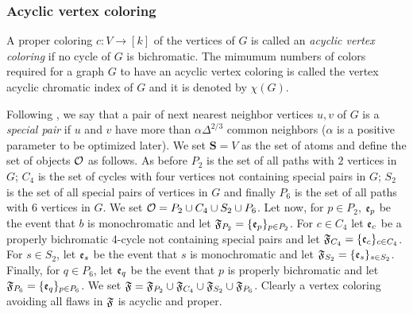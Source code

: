 \documentclass[11pt]{article}
\let\a=\alpha \let\b=\beta \let\ch=\chi \let\d=\delta \let\e=\varepsilon
\let\D=\Delta \let\F=\Phi \let\G=\Gamma \let\L=\Lambda \let\Th=\Theta
\let\\=\noindent
\begin{document}
\subsubsection{Acyclic vertex coloring}
A proper coloring $c: V\to [k]$ of the vertices of $G$ is called
an {\it acyclic vertex  coloring} if no cycle of $G$
is bichromatic. The mimumum numbers of colors required
for a graph $G$ to have an acyclic vertex  coloring is called the vertex acyclic chromatic index of $G$ and  it is denoted by $\chi(G)$.

\\Following \cite{AMR},  we say that  a pair of next nearest neighbor vertices $u,v$ of $G$ is a {\it special pair} if
$u$ and $v$ have more than $\a\D^{2/3}$ common neighbors ($\a$ is a positive parameter to be optimized  later).
We set $\mathbf{S}=V$ as the set of atoms and define the set of objects ${{\mathcal O}}$ as follows. As before $P_2$   is the set of all paths  with $2$ vertices in  $G$; $C_4$ is the set of cycles with four vertices not containing special pairs in  $G$; $S_2$ is the set of all special pairs of vertices in $G$ and finally $P_6$ is the set of all paths with 6 vertices in $G$. We set ${{\mathcal O}}=P_2\cup C_4\cup S_2\cup P_6$. Let now, for $p\in P_2$, ${\mathfrak{e}}_p$ be the event that $b$ is monochromatic and let ${\mathfrak{F}}_{P_2}=\{{\mathfrak{e}}_p\}_{p\in P_2}$. For $c\in C_4$ let ${\mathfrak{e}}_c$ be a properly bichromatic 4-cycle  not containing special pairs and let ${\mathfrak{F}}_{C_4}=\{{\mathfrak{e}}_c\}_{c\in C_4}$. For $s\in S_2$, let ${\mathfrak{e}}_s$ be the event that $s$ is monochromatic and let ${\mathfrak{F}}_{S_2}=\{{\mathfrak{e}}_s\}_{s\in S_2}$. Finally, for $q\in P_6$, let ${\mathfrak{e}}_q$ be the event that $p$ is properly bichromatic and let ${\mathfrak{F}}_{P_6}=\{{\mathfrak{e}}_q\}_{p\in P_6}$. We set ${\mathfrak{F}}= {\mathfrak{F}}_{P_2}\cup {\mathfrak{F}}_{C_4}\cup {\mathfrak{F}}_{S_2} \cup{\mathfrak{F}}_{P_6}$. Clearly a vertex coloring avoiding all
flaws in ${\mathfrak{F}}$ is acyclic and proper.
\end{document}
